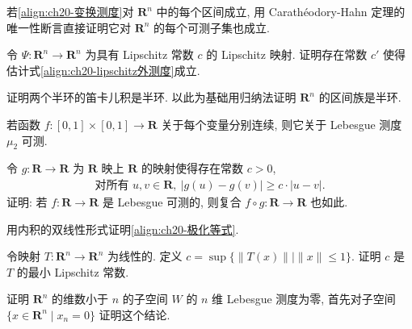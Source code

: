 \documentclass[../../main.tex]{subfiles}
\begin{document}
\begin{exercise}\label{exercise:ch20-23}
若\eqref{align:ch20-变换测度}对 $\mathbf{R}^{n}$ 中的每个区间成立, 用 Carath\'eodory-Hahn 定理的唯一性断言直接证明它对 $\mathbf{R}^{n}$ 的每个可测子集也成立.
\end{exercise}

\begin{exercise}\label{exercise:ch20-24}
令 $\Psi:\mathbf{R}^{n}\to\mathbf{R}^{n}$ 为具有 Lipschitz 常数 $c$ 的 Lipschitz 映射. 证明存在常数 $c'$ 使得估计式\eqref{align:ch20-lipschitz外测度}成立.
\end{exercise}

\begin{exercise}\label{exercise:ch20-25}
证明两个半环的笛卡儿积是半环. 以此为基础用归纳法证明 $\mathbf{R}^{n}$ 的区间族是半环.
\end{exercise}

\begin{exercise}\label{exercise:ch20-26}
若函数 $f:[0,1]\times[0,1]\to\mathbf{R}$ 关于每个变量分别连续, 则它关于 Lebesgue 测度 $\mu_{2}$ 可测.
\end{exercise}

\begin{exercise}\label{exercise:ch20-27}
令 $g:\mathbf{R}\to\mathbf{R}$ 为 $\mathbf{R}$ 映上 $\mathbf{R}$ 的映射使得存在常数 $c>0$,
\begin{align*}
\text{对所有 }u,v\in\mathbf{R},\ |g(u)-g(v)|\geqslant c\cdot|u-v|.
\end{align*}
证明: 若 $f:\mathbf{R}\to\mathbf{R}$ 是 Lebesgue 可测的, 则复合 $f\circ g:\mathbf{R}\to\mathbf{R}$ 也如此.
\end{exercise}

\begin{exercise}\label{exercise:ch20-28}
用内积的双线性形式证明\eqref{align:ch20-极化等式}.
\end{exercise}

\begin{exercise}\label{exercise:ch20-29}
令映射 $T:\mathbf{R}^{n}\to\mathbf{R}^{n}$ 为线性的. 定义 $c=\sup\{\|T(x)\|\mid\|x\|\leqslant 1\}$. 证明 $c$ 是 $T$ 的最小 Lipschitz 常数.
\end{exercise}

\begin{exercise}\label{exercise:ch20-30}
证明 $\mathbf{R}^{n}$ 的维数小于 $n$ 的子空间 $W$ 的 $n$ 维 Lebesgue 测度为零, 首先对子空间 $\{x\in\mathbf{R}^{n}\mid x_{n}=0\}$ 证明这个结论.
\end{exercise}
\end{document}
